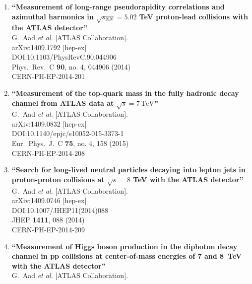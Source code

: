 \documentclass{article}
\begin{document}
\begin{enumerate}
\item%
{\bf ``Measurement of long-range pseudorapidity correlations and azimuthal harmonics in $\sqrt{s_{NN}}=5.02$ TeV proton-lead collisions with the ATLAS detector''}
  \\{}G.~Aad {\it et al.} [ATLAS Collaboration].
  \\{}arXiv:1409.1792 [hep-ex]
  \\{}DOI:10.1103/PhysRevC.90.044906
  \\{}Phys.\ Rev.\ C {\bf 90}, no. 4, 044906 (2014)
  \\{}CERN-PH-EP-2014-201
\item%
{\bf ``Measurement of the top-quark mass in the fully hadronic decay channel from ATLAS data at $\sqrt{s}=7\mathrm{\,TeV}$''}
  \\{}G.~Aad {\it et al.} [ATLAS Collaboration].
  \\{}arXiv:1409.0832 [hep-ex]
  \\{}DOI:10.1140/epjc/s10052-015-3373-1
  \\{}Eur.\ Phys.\ J.\ C {\bf 75}, no. 4, 158 (2015)
  \\{}CERN-PH-EP-2014-208
\item%
{\bf ``Search for long-lived neutral particles decaying into lepton jets in proton-proton collisions at $ \sqrt{s}=8 $ TeV with the ATLAS detector''}
  \\{}G.~Aad {\it et al.} [ATLAS Collaboration].
  \\{}arXiv:1409.0746 [hep-ex]
  \\{}DOI:10.1007/JHEP11(2014)088
  \\{}JHEP {\bf 1411}, 088 (2014)
  \\{}CERN-PH-EP-2014-209
\item%
{\bf ``Measurement of Higgs boson production in the diphoton decay channel in pp collisions at center-of-mass energies of 7 and 8 TeV with the ATLAS detector''}
  \\{}G.~Aad {\it et al.} [ATLAS Collaboration].

\end{enumerate}
\end{document}
